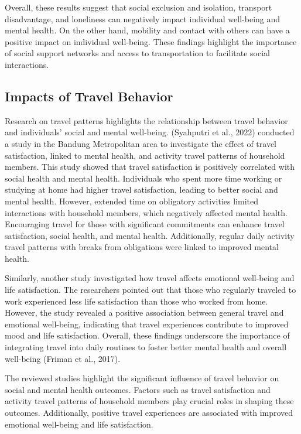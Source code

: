 \documentclass[
  letterpaper,
  number,
  review,
  3p]{elsarticle}
\begin{document}
Overall, these results suggest that social exclusion and isolation,
transport disadvantage, and loneliness can negatively impact individual
well-being and mental health. On the other hand, mobility and contact
with others can have a positive impact on individual well-being. These
findings highlight the importance of social support networks and access
to transportation to facilitate social interactions.

\subsection{Impacts of Travel
Behavior}\label{impacts-of-travel-behavior}

Research on travel patterns highlights the relationship between travel
behavior and individuals' social and mental well-being. (Syahputri et
al., 2022) conducted a study in the Bandung Metropolitan area to
investigate the effect of travel satisfaction, linked to mental health,
and activity travel patterns of household members. This study showed
that travel satisfaction is positively correlated with social health and
mental health. Individuals who spent more time working or studying at
home had higher travel satisfaction, leading to better social and mental
health. However, extended time on obligatory activities limited
interactions with household members, which negatively affected mental
health. Encouraging travel for those with significant commitments can
enhance travel satisfaction, social health, and mental health.
Additionally, regular daily activity travel patterns with breaks from
obligations were linked to improved mental health.

Similarly, another study investigated how travel affects emotional
well-being and life satisfaction. The researchers pointed out that those
who regularly traveled to work experienced less life satisfaction than
those who worked from home. However, the study revealed a positive
association between general travel and emotional well-being, indicating
that travel experiences contribute to improved mood and life
satisfaction. Overall, these findings underscore the importance of
integrating travel into daily routines to foster better mental health
and overall well-being (Friman et al., 2017).

The reviewed studies highlight the significant influence of travel
behavior on social and mental health outcomes. Factors such as travel
satisfaction and activity travel patterns of household members play
crucial roles in shaping these outcomes. Additionally, positive travel
experiences are associated with improved emotional well-being and life
satisfaction.
\end{document}
